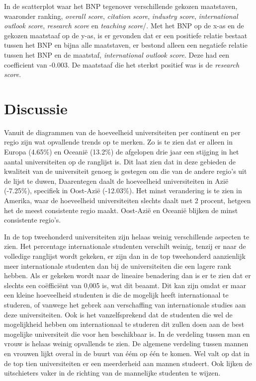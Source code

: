 \documentclass{uva-inf-article}
\begin{document}
In de scatterplot waar het BNP tegenover verschillende gekozen maatstaven, waaronder ranking, \textit{overall score}, \textit{citation score}, \textit{industry score}, \textit{international outlook score}, \textit{research score} en \textit{teaching score}/. Met het BNP op de x-as en de gekozen maatstaaf op de y-as, is er gevonden dat er een positiefe relatie bestaat tussen het BNP en bijna alle maatstaven, er bestond alleen een negatiefe relatie tussen het BNP en de maatstaf, \textit{international outlook score}. Deze had een coefficient van -0.003. De maatstaaf die het sterkst positief was is de \textit{research score}.


\newpage

\section*{Discussie}

Vanuit de diagrammen van de hoeveelheid universiteiten per continent en per regio zijn wat
opvallende trends op te merken. Zo is te zien dat er alleen in Europa (4.65\%) en Oceanië (13.2\%) de
afgelopen drie jaar een stijging in het aantal universiteiten op de ranglijst is. Dit laat zien dat in deze gebieden de kwaliteit van de universiteit genoeg is gestegen om die van de andere regio's uit de lijst te duwen, Daarentegen daalt de hoeveelheid universiteiten in Azië (-7.25\%), specifiek in Oost-Azië (-12.03\%). Het minst verandering is te zien in Amerika, waar de hoeveelheid universiteiten slechts daalt met 2 procent, hetgeen het de meest consistente regio maakt. Oost-Azië en Oceanië blijken de minst consistente regio's.

In de top tweehonderd universiteiten zijn helaas weinig verschillende aspecten te zien. Het percentage
internationale studenten verschilt weinig, tenzij er naar de volledige ranglijst wordt gekeken, er zijn dan in de top tweehonderd aanzienlijk meer internationale studenten dan bij de universiteiten die een lagere rank hebben. Als er gekeken wordt naar de lineaire benadering dan is er te zien dat er slechts een coëfficiënt van 0,005 is, wat dit beaamt. Dit kan zijn omdat er maar een kleine hoeveelheid studenten is die de mogelijk heeft internationaal te studeren, of vanwege het gebrek aan verschaffing van internationale studies aan deze universiteiten. Ook is het vanzelfsprekend dat de studenten die wel de mogelijkheid hebben om internationaal te studeren dit zullen doen aan de best mogelijke universiteit die voor hen beschikbaar is. In de verdeling tussen man en vrouw is helaas weinig opvallends te zien. De algemene verdeling tussen mannen en vrouwen lijkt overal in de buurt van éém op één te komen. Wel valt op dat in de top tien universiteiten er een meerderheid aan mannen studeert. Ook lijken de uitschieters vaker in de richting van de mannelijke studenten te wijzen.
\end{document}
